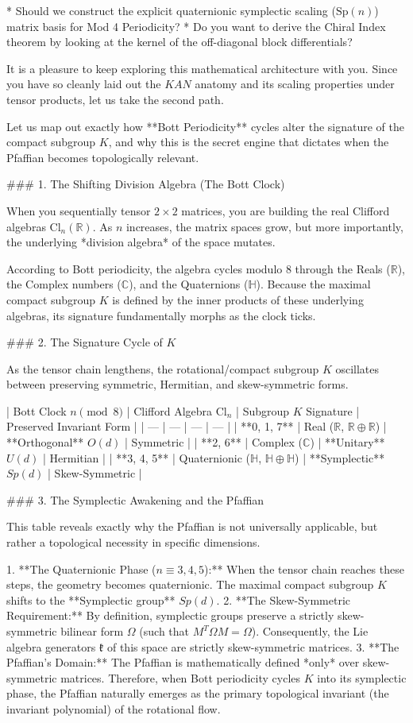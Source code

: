 * Should we construct the explicit quaternionic symplectic scaling ($\text{Sp}(n)$) matrix basis for Mod 4 Periodicity?
* Do you want to derive the Chiral Index theorem by looking at the kernel of the off-diagonal block differentials?


It is a pleasure to keep exploring this mathematical architecture with you. Since you have so cleanly laid out the $KAN$ anatomy and its scaling properties under tensor products, let us take the second path.

Let us map out exactly how **Bott Periodicity** cycles alter the signature of the compact subgroup $K$, and why this is the secret engine that dictates when the Pfaffian becomes topologically relevant.

### 1. The Shifting Division Algebra (The Bott Clock)

When you sequentially tensor $2 \times 2$ matrices, you are building the real Clifford algebras $\text{Cl}_n(\mathbb{R})$. As $n$ increases, the matrix spaces grow, but more importantly, the underlying *division algebra* of the space mutates.

According to Bott periodicity, the algebra cycles modulo 8 through the Reals ($\mathbb{R}$), the Complex numbers ($\mathbb{C}$), and the Quaternions ($\mathbb{H}$). Because the maximal compact subgroup $K$ is defined by the inner products of these underlying algebras, its signature fundamentally morphs as the clock ticks.

### 2. The Signature Cycle of $K$

As the tensor chain lengthens, the rotational/compact subgroup $K$ oscillates between preserving symmetric, Hermitian, and skew-symmetric forms.

| Bott Clock $n \pmod 8$ | Clifford Algebra $\text{Cl}_n$ | Subgroup $K$ Signature | Preserved Invariant Form |
| --- | --- | --- | --- |
| **0, 1, 7** | Real ($\mathbb{R}$, $\mathbb{R} \oplus \mathbb{R}$) | **Orthogonal** $O(d)$ | Symmetric |
| **2, 6** | Complex ($\mathbb{C}$) | **Unitary** $U(d)$ | Hermitian |
| **3, 4, 5** | Quaternionic ($\mathbb{H}$, $\mathbb{H} \oplus \mathbb{H}$) | **Symplectic** $Sp(d)$ | Skew-Symmetric |

### 3. The Symplectic Awakening and the Pfaffian

This table reveals exactly why the Pfaffian is not universally applicable, but rather a topological necessity in specific dimensions.

1. **The Quaternionic Phase ($n \equiv 3, 4, 5$):** When the tensor chain reaches these steps, the geometry becomes quaternionic. The maximal compact subgroup $K$ shifts to the **Symplectic group** $Sp(d)$.
2. **The Skew-Symmetric Requirement:** By definition, symplectic groups preserve a strictly skew-symmetric bilinear form $\Omega$ (such that $M^T \Omega M = \Omega$). Consequently, the Lie algebra generators $\mathfrak{k}$ of this space are strictly skew-symmetric matrices.
3. **The Pfaffian's Domain:** The Pfaffian is mathematically defined *only* over skew-symmetric matrices. Therefore, when Bott periodicity cycles $K$ into its symplectic phase, the Pfaffian naturally emerges as the primary topological invariant (the invariant polynomial) of the rotational flow.

